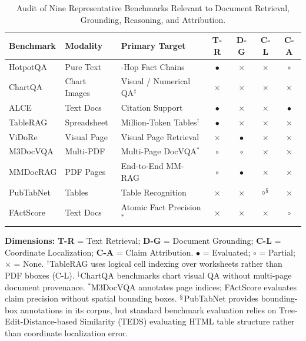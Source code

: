 \documentclass[conference,a4paper]{IEEEtran}
\begin{document}
\begin{table}[htbp]
\caption{Audit of Nine Representative Benchmarks Relevant to Document Retrieval, Grounding, Reasoning, and Attribution.}
\centering
\scriptsize
\setlength{\tabcolsep}{1.2pt}
\begin{tabularx}{\columnwidth}{@{}p{1.9cm}p{1.3cm}>{\raggedright\arraybackslash}Xcccc@{}}
\toprule
\textbf{Benchmark} & \textbf{Modality} & \textbf{Primary Target} & \textbf{T-R} & \textbf{D-G} & \textbf{C-L} & \textbf{C-A} \\
\midrule
HotpotQA \cite{yang2018hotpotqa} & Pure Text & 2-Hop Fact Chains & $\bullet$ & $\times$ & $\times$ & $\circ$ \\
ChartQA \cite{masry2022} & Chart Images & Visual / Numerical QA$^\ddagger$ & $\times$ & $\times$ & $\times$ & $\times$ \\
ALCE \cite{gao2023alce} & Text Docs & Citation Support & $\bullet$ & $\times$ & $\times$ & $\bullet$ \\
TableRAG \cite{chen2024tablerag} & Spreadsheet & Million-Token Tables$^\dagger$ & $\bullet$ & $\times$ & $\times$ & $\times$ \\
ViDoRe \cite{faysse2025colpali} & Visual Page & Visual Page Retrieval & $\times$ & $\bullet$ & $\times$ & $\times$ \\
M3DocVQA \cite{m3docvqa2025} & Multi-PDF & Multi-Page DocVQA$^*$ & $\circ$ & $\circ$ & $\times$ & $\times$ \\
MMDocRAG \cite{dong2025mmdocrag} & PDF Pages & End-to-End MM-RAG & $\circ$ & $\bullet$ & $\times$ & $\times$ \\
PubTabNet \cite{zhong2020pubtabnet} & Tables & Table Recognition & $\times$ & $\times$ & $\circ^\mathsection$ & $\times$ \\
FActScore \cite{min2023factscore} & Text Docs & Atomic Fact Precision$^*$ & $\times$ & $\times$ & $\times$ & $\circ$ \\
\bottomrule
\end{tabularx}
\vspace{1.5pt}
\begin{minipage}{\columnwidth}
{\scriptsize\raggedright \textbf{Dimensions:} \textbf{T-R} = Text Retrieval; \textbf{D-G} = Document Grounding; \textbf{C-L} = Coordinate Localization; \textbf{C-A} = Claim Attribution. $\bullet$ = Evaluated; $\circ$ = Partial; $\times$ = None. $^\dagger$TableRAG uses logical cell indexing over worksheets rather than PDF bboxes (C-L). $^\ddagger$ChartQA benchmarks chart visual QA without multi-page document provenance. $^*$M3DocVQA annotates page indices; FActScore evaluates claim precision without spatial bounding boxes. $^\mathsection$PubTabNet provides bounding-box annotations in its corpus, but standard benchmark evaluation relies on Tree-Edit-Distance-based Similarity (TEDS) evaluating HTML table structure rather than coordinate localization error.\par}
\end{minipage}
\label{tab:benchmarks}
\end{table}
\end{document}
